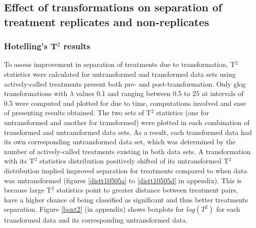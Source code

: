 \documentclass[11pt]{article}
\begin{document}

\subsection{Effect of transformations on separation of treatment replicates and non-replicates}
\subsubsection{Hotelling's T$^2$ results}\label{hoteliresults}

\par{To assess improvement in separation of treatments due to transformation, T$^2$ statistics were calculated for untransformed and transformed data sets using actively-called treatments present both pre- and post-transformation. Only glog transformations with $\lambda$ values 0.1 and ranging between 0.5 to 25 at intervals of 0.5 were computed and plotted for due to time, computations involved and ease of presenting results obtained. The two sets of T$^2$ statistics (one for untransformed and another for transformed) were plotted in each combination of transformed and untransformed data sets. As a result, each transformed data had its own corresponding untransformed data set, which was determined by the number of actively-called treatments existing in both data sets. A transformation with its T$^2$ statistics distribution positively shifted of its untransformed T$^2$ distribution implied improved separation for treatments compared to when data was untransformed (figures \ref{distt10505a} to \ref{distt10505d} in appendix). This is because large T$^2$ statistics point to greater distance between treatment pairs, have a higher chance of being classified as significant and thus better treatments separation. Figure \ref{boxt2} (in appendix) shows boxplots for $log(T^2)$ for each transformed data and its corresponding untransformed data.}
\end{document}

